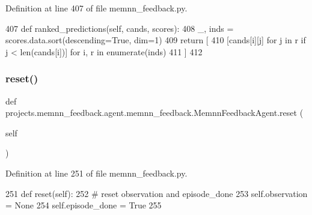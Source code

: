 Definition at line 407 of file memnn\+\_\+feedback.\+py.


\begin{DoxyCode}
407     \textcolor{keyword}{def }ranked\_predictions(self, cands, scores):
408         \_, inds = scores.data.sort(descending=\textcolor{keyword}{True}, dim=1)
409         \textcolor{keywordflow}{return} [
410             [cands[i][j] \textcolor{keywordflow}{for} j \textcolor{keywordflow}{in} r \textcolor{keywordflow}{if} j < len(cands[i])] \textcolor{keywordflow}{for} i, r \textcolor{keywordflow}{in} enumerate(inds)
411         ]
412 
\end{DoxyCode}
\mbox{\label{classprojects_1_1memnn__feedback_1_1agent_1_1memnn__feedback_1_1MemnnFeedbackAgent_a190948d766ed7c0fa025ec194ed1ff97}} 
\subsubsection{\texorpdfstring{reset()}{reset()}}
{\footnotesize\ttfamily def projects.\+memnn\+\_\+feedback.\+agent.\+memnn\+\_\+feedback.\+Memnn\+Feedback\+Agent.\+reset (\begin{DoxyParamCaption}\item[{}]{self }\end{DoxyParamCaption})}



Definition at line 251 of file memnn\+\_\+feedback.\+py.


\begin{DoxyCode}
251     \textcolor{keyword}{def }reset(self):
252         \textcolor{comment}{# reset observation and episode\_done}
253         self.observation = \textcolor{keywordtype}{None}
254         self.episode\_done = \textcolor{keyword}{True}
255 
\end{DoxyCode}
\mbox{\label{classprojects_1_1memnn__feedback_1_1agent_1_1memnn__feedback_1_1MemnnFeedbackAgent_a2e17ab619266912c4294886a57645399}} 
